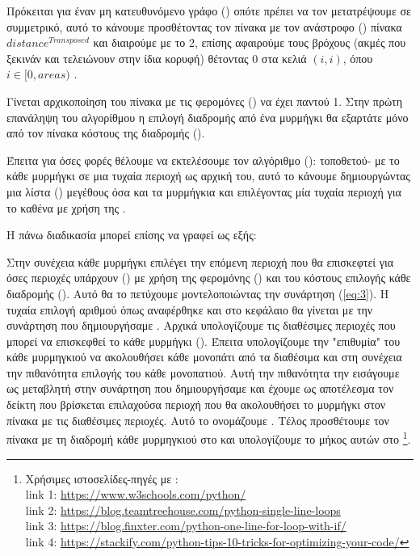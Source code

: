 Πρόκειται για έναν μη κατευθυνόμενο γράφο () οπότε πρέπει να τον μετατρέψουμε σε συμμετρικό, αυτό το κάνουμε προσθέτοντας τον πίνακα  με τον ανάστροφο () πίνακα $distance^{Transposed}$ και διαιρούμε με το 2, επίσης αφαιρούμε τους βρόχους (ακμές που ξεκινάν και τελειώνουν στην ίδια κορυφή) θέτοντας 0 στα κελιά $(i,i)$, όπου $i\in[0,areas)$ \cite{perez2020introduction}.


Γίνεται αρχικοποίηση του πίνακα με τις φερομόνες () να έχει παντού 1. Στην πρώτη επανάληψη του αλγορίθμου η επιλογή διαδρομής από ένα μυρμήγκι θα εξαρτάτε μόνο από τον πίνακα κόστους της διαδρομής (). 


Έπειτα για όσες φορές θέλουμε να εκτελέσουμε τον αλγόριθμο ():
τοποθετού- με το κάθε μυρμήγκι σε μια τυχαία περιοχή ως αρχική του, αυτό το κάνουμε δημιουργώντας μια λίστα () μεγέθους όσα και τα μυρμήγκια και επιλέγοντας μία τυχαία περιοχή για το καθένα με χρήση της  \cite{w3school}.

Η πάνω διαδικασία μπορεί επίσης να γραφεί ως εξής: 


Στην συνέχεια κάθε μυρμήγκι επιλέγει την επόμενη περιοχή που θα επισκεφτεί για όσες περιοχές υπάρχουν () με χρήση της φερομόνης () και του κόστους επιλογής κάθε διαδρομής (). Αυτό θα το πετύχουμε μοντελοποιώντας την συνάρτηση (\ref{eq:3}). Η τυχαία επιλογή αριθμού όπως αναφέρθηκε και στο κεφάλαιο  θα γίνεται με την συνάρτηση  που δημιουργήσαμε \cite{lipowski2012roulette}.
Αρχικά υπολογίζουμε τις διαθέσιμες περιοχές που μπορεί να επισκεφθεί το κάθε μυρμήγκι (). Έπειτα υπολογίζουμε την "επιθυμία" του κάθε μυρμηγκιού να ακολουθήσει κάθε μονοπάτι από τα διαθέσιμα και στη συνέχεια την πιθανότητα επιλογής του κάθε μονοπατιού. Αυτή την πιθανότητα την εισάγουμε ως μεταβλητή στην συνάρτηση  που δημιουργήσαμε και έχουμε ως αποτέλεσμα τον δείκτη που βρίσκεται επιλαχούσα περιοχή που θα ακολουθήσει το μυρμήγκι στον πίνακα με τις διαθέσιμες περιοχές. Αυτό το ονομάζουμε . Τέλος προσθέτουμε τον πίνακα με τη διαδρομή κάθε μυρμηγκιού στο  και υπολογίζουμε το μήκος αυτών στο \footnote{Xρήσιμες ιστοσελίδες-πηγές με : \\
link 1: \url{https://www.w3schools.com/python/}\\
link 2: \url{https://blog.teamtreehouse.com/python-single-line-loops} \\
link 3: \url{https://blog.finxter.com/python-one-line-for-loop-with-if/}\\
link 4: \url{https://stackify.com/python-tips-10-tricks-for-optimizing-your-code/}
}.


